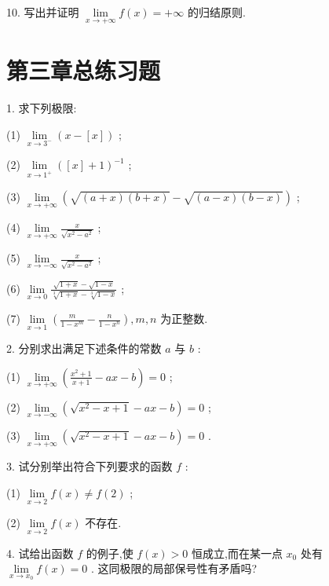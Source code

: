 10. 写出并证明 \(\mathop{\lim }\limits_{{x \rightarrow   + \infty }}f\left( x\right)  =  + \infty\) 的归结原则.

\section{第三章总练习题}

1. 求下列极限:

(1) \(\mathop{\lim }\limits_{{x \rightarrow  {3}^{ - }}}\left( {x - \left\lbrack  x\right\rbrack  }\right)\) ;

(2) \(\mathop{\lim }\limits_{{x \rightarrow  {1}^{ + }}}{\left( \left\lbrack  x\right\rbrack   + 1\right) }^{-1}\) ;

(3) \(\mathop{\lim }\limits_{{x \rightarrow   + \infty }}\left( {\sqrt{\left( {a + x}\right) \left( {b + x}\right) } - \sqrt{\left( {a - x}\right) \left( {b - x}\right) }}\right)\) ;

(4) \(\mathop{\lim }\limits_{{x \rightarrow   + \infty }}\frac{x}{\sqrt{{x}^{2} - {a}^{2}}}\) ;

(5) \(\mathop{\lim }\limits_{{x \rightarrow   - \infty }}\frac{x}{\sqrt{{x}^{2} - {a}^{2}}}\) ;

(6) \(\mathop{\lim }\limits_{{x \rightarrow  0}}\frac{\sqrt{1 + x} - \sqrt{1 - x}}{\sqrt[3]{1 + x} - \sqrt[3]{1 - x}}\) ;

(7) \(\mathop{\lim }\limits_{{x \rightarrow  1}}\left( {\frac{m}{1 - {x}^{m}} - \frac{n}{1 - {x}^{n}}}\right) ,m,n\) 为正整数.

2. 分别求出满足下述条件的常数 \(a\) 与 \(b\) :

(1) \(\mathop{\lim }\limits_{{x \rightarrow   + \infty }}\left( {\frac{{x}^{2} + 1}{x + 1} - {ax} - b}\right)  = 0\) ;

(2) \(\mathop{\lim }\limits_{{x \rightarrow   - \infty }}\left( {\sqrt{{x}^{2} - x + 1} - {ax} - b}\right)  = 0\) ;

(3) \(\mathop{\lim }\limits_{{x \rightarrow   + \infty }}\left( {\sqrt{{x}^{2} - x + 1} - {ax} - b}\right)  = 0\) .

3. 试分别举出符合下列要求的函数 \(f\) :

(1) \(\mathop{\lim }\limits_{{x \rightarrow  2}}f\left( x\right)  \neq  f\left( 2\right)\) ;

(2) \(\mathop{\lim }\limits_{{x \rightarrow  2}}f\left( x\right)\) 不存在.

4. 试给出函数 \(f\) 的例子,使 \(f\left( x\right)  > 0\) 恒成立,而在某一点 \({x}_{0}\) 处有 \(\mathop{\lim }\limits_{{x \rightarrow  {x}_{0}}}f\left( x\right)  = 0\) . 这同极限的局部保号性有矛盾吗?

